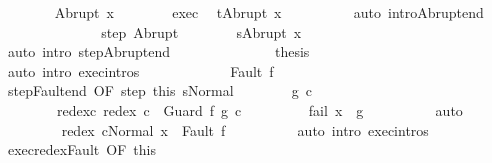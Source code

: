 \begin{isabellebody}
\isanewline
\ \ \ \ \ \ \isamarkupfalse%
\ {\isacharparenleft}Abrupt\ x{\isacharprime}{\isacharparenright}\isanewline
\ \ \ \ \ \ \isamarkupfalse%
\ exec{\isacharprime}\ \isamarkupfalse%
\ {\isachardoublequoteopen}t{\isacharequal}Abrupt\ x{\isacharprime}{\isachardoublequoteclose}\isanewline
\ \ \ \ \ \ \ \ \isamarkupfalse%
\ {\isacharparenleft}auto\ intro{\isacharcolon}Abrupt{\isacharunderscore}end{\isacharparenright}\isanewline
\ \ \ \ \ \ \isamarkupfalse%
\isanewline
\ \ \ \ \ \ \isamarkupfalse%
\ step\ Abrupt\isanewline
\ \ \ \ \ \ \isamarkupfalse%
\ {\isachardoublequoteopen}s{\isacharequal}Abrupt\ x{\isacharprime}{\isachardoublequoteclose}\isanewline
\ \ \ \ \ \ \ \ \isamarkupfalse%
\ {\isacharparenleft}auto\ intro{\isacharcolon}\ step{\isacharunderscore}Abrupt{\isacharunderscore}end{\isacharparenright}\isanewline
\ \ \ \ \ \ \isamarkupfalse%
\isanewline
\ \ \ \ \ \ \isamarkupfalse%
\ {\isacharquery}thesis\isanewline
\ \ \ \ \ \ \ \ \isamarkupfalse%
\ {\isacharparenleft}auto\ intro{\isacharcolon}\ exec{\isachardot}intros{\isacharparenright}\isanewline
\ \ \ \ \isamarkupfalse%
\isanewline
\ \ \ \ \ \ \isamarkupfalse%
\ {\isacharparenleft}Fault\ f{\isacharparenright}\isanewline
\ \ \ \ \ \ \isamarkupfalse%
\ step{\isacharunderscore}Fault{\isacharunderscore}end\ {\isacharbrackleft}OF\ step\ this{\isacharbrackright}\ s{\isacharunderscore}Normal\isanewline
\ \ \ \ \ \ \isamarkupfalse%
\ g\ c\ \ \isanewline
\ \ \ \ \ \ \ \ redex{\isacharunderscore}c\ {\isachardoublequoteopen}redex\ c\ {\isacharequal}\ Guard\ f\ g\ c{\isachardoublequoteclose}\ \isanewline
\ \ \ \ \ \ \ \ fail{\isacharcolon}\ {\isachardoublequoteopen}x\ {\isasymnotin}\ g{\isachardoublequoteclose}\isanewline
\ \ \ \ \ \ \ \ \isamarkupfalse%
\ auto\isanewline
\ \ \ \ \ \ \isamarkupfalse%
\ {\isachardoublequoteopen}{\isasymGamma}{\isasymturnstile}\ {\isasymlangle}redex\ cNormal\ x{\isasymrangle}\ {\isasymRightarrow}\ Fault\ f{\isachardoublequoteclose}\isanewline
\ \ \ \ \ \ \ \ \isamarkupfalse%
\ {\isacharparenleft}auto\ intro{\isacharcolon}\ exec{\isachardot}intros{\isacharparenright}\isanewline
\ \ \ \ \ \ \isamarkupfalse%
\ exec{\isacharunderscore}redex{\isacharunderscore}Fault\ {\isacharbrackleft}OF\ this{\isacharbrackright}\isanewline

\end{isabellebody}
